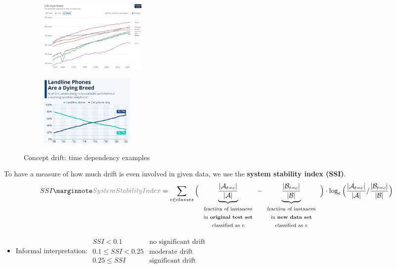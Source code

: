\begin{figure}[H]
  \centering
  \begin{subfigure}{0.4\textwidth}
    \centering
    \includegraphics[height=3.5cm]{assets/sl/cd__example_1.png}
  \end{subfigure}
  \hspace*{0.05\textwidth}
  \begin{subfigure}{0.4\textwidth}
    \centering
    \includegraphics[height=3.5cm]{assets/sl/cd__example_2.png}
  \end{subfigure}

  \caption{Concept drift: time dependency examples}
  \label{fig:7_cd_include_before}
\end{figure}

To have a measure of how much drift is even involved in given data, we use the \textbf{system stability index (SSI)}.
\begin{align*}
  SSI\sidenote{System Stability Index} = \sum_{c \in classes}\Big(
    \underbrace{\frac{|\mathcal{A}_{t=c}|}{|\mathcal{A}|}}_{\begin{array}{c}
      \scriptstyle\text{fraction of instances}\\
      \scriptstyle\text{in \textbf{original test set}}\\
      \scriptstyle\text{classified as }c
    \end{array}} -
    \underbrace{\frac{|\mathcal{B}_{t=c}|}{|\mathcal{B}|}}_{\begin{array}{c}
      \scriptstyle\text{fraction of instances}\\
      \scriptstyle\text{in \textbf{new data set}}\\
      \scriptstyle\text{classified as }c
    \end{array}} 
  \Big) \cdot \log_e
  \Big(
    \frac{|\mathcal{A}_{t=c}|}{|\mathcal{A}|} /
    \frac{|\mathcal{B}_{t=c}|}{|\mathcal{B}|}
  \Big)
\end{align*}
\begin{itemize}
  \item Informal interpretation: $\begin{array}{rl}
    SSI < 0.1 & \text{no significant drift}\\
    0.1 \leq SSI < 0.25 & \text{moderate drift}\\
    0.25 \leq SSI & \text{significant drift}
  \end{array}$
\end{itemize}

